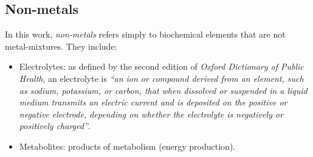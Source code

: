 \subsection{Non-metals}
In this work, \emph{non-metals} refers simply to biochemical elements that are not metal-mixtures. They include:
\begin{itemize}
\item Electrolytes: as defined by the second edition of \emph{Oxford Dictionary of Public Health}, an electrolyte is \emph{``an ion or compound derived from an element, such as sodium, potassium, or carbon, that when dissolved or suspended in a liquid medium transmits an electric current and is deposited on the positive or negative electrode, depending on whether the electrolyte is negatively or positively charged''}\cite{last_dictionary_2018}. 
\item Metabolites: products of metabolism (energy production).
\end{itemize}



